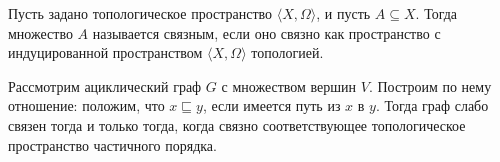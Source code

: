\begin{theorem} Пусть задано топологическое пространство $\langle X, \Omega \rangle$, и пусть
$A \subseteq X$. Тогда множество $A$ называется связным, если оно связно как пространство
с индуцированной пространством $\langle X, \Omega \rangle$ топологией.
\end{theorem}

\begin{theorem} Рассмотрим ациклический граф $G$ с множеством вершин $V$. Построим по нему
отношение: положим, что $x \sqsubseteq y$, если имеется путь из $x$ в $y$.
Тогда граф слабо связен тогда и только тогда, когда связно соответствующее топологическое 
пространство частичного порядка. 
\end{theorem}

